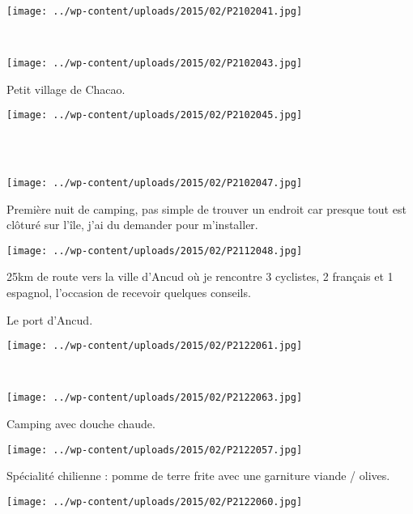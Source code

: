 \pagebreak
~
\begin{center} \texttt{[image: ../wp-content/uploads/2015/02/P2102041.jpg]} \end{center}
~
\begin{center} \texttt{[image: ../wp-content/uploads/2015/02/P2102043.jpg]} \end{center}
\vspace{-\topsep}

\pagebreak
 Petit village de Chacao.\\
\begin{center} \texttt{[image: ../wp-content/uploads/2015/02/P2102045.jpg]} \end{center}
~\\

~
\begin{center} \texttt{[image: ../wp-content/uploads/2015/02/P2102047.jpg]} \end{center}
\vspace{-\topsep}

\pagebreak
 Première nuit de camping, pas simple de trouver un endroit car presque tout est clôturé sur l'île, j'ai du demander pour m'installer. 
\begin{center} \texttt{[image: ../wp-content/uploads/2015/02/P2112048.jpg]} \end{center}

 25km de route vers la ville d'Ancud où je rencontre 3 cyclistes, 2 français et 1 espagnol, l'occasion de recevoir quelques conseils.

 Le port d'Ancud.
\begin{center} \texttt{[image: ../wp-content/uploads/2015/02/P2122061.jpg]} \end{center}
\vspace{-\topsep}

\pagebreak
~
\vspace{-3mm}
\begin{center} \texttt{[image: ../wp-content/uploads/2015/02/P2122063.jpg]} \end{center}

 Camping avec douche chaude.
\begin{center} \texttt{[image: ../wp-content/uploads/2015/02/P2122057.jpg]} \end{center}
\vspace{-\topsep}

\pagebreak
Spécialité chilienne : pomme de terre frite avec une garniture viande / olives.
\begin{center} \texttt{[image: ../wp-content/uploads/2015/02/P2122060.jpg]} \end{center}
